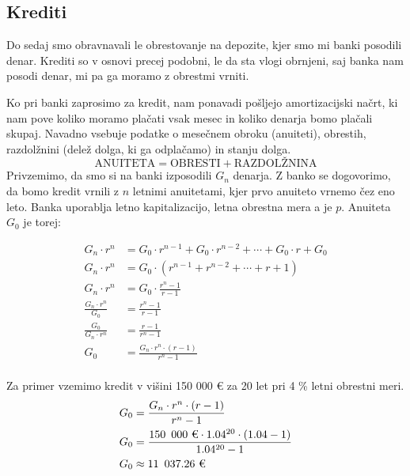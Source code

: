 \documentclass[12pt]{article}
\begin{document}
    \subsection{Krediti}
    Do sedaj smo obravnavali le obrestovanje na depozite, kjer smo mi banki posodili denar.
    Krediti so v osnovi precej podobni, le da sta vlogi obrnjeni, saj banka nam posodi
    denar, mi pa ga moramo z obrestmi vrniti.

    Ko pri banki zaprosimo za kredit, nam ponavadi pošljejo amortizacijski načrt, ki nam
    pove koliko moramo plačati vsak mesec in koliko denarja bomo plačali skupaj. Navadno
    vsebuje podatke o mesečnem obroku (anuiteti), obrestih, razdolžnini (delež dolga, ki 
    ga odplačamo) in stanju dolga. 
    $$\text{ANUITETA} = \text{OBRESTI} + \text{RAZDOLŽNINA}$$
    Privzemimo, da smo si na banki izposodili $G_n$ denarja. Z banko se dogovorimo, da bomo
    kredit vrnili z $n$ letnimi anuitetami, kjer prvo anuiteto vrnemo čez eno leto. Banka
    uporablja letno kapitalizacijo, letna obrestna mera a je $p$. Anuiteta $G_0$ je torej:
    
    \begin{equation}
        \begin{split}
            G_n \cdot r^n & = G_0 \cdot r^{n - 1} + G_0 \cdot r^{n - 2} + \cdots + G_0 \cdot r + G_0 \\
            G_n \cdot r^n & = G_0 \cdot (r^{n - 1} + r^{n - 2} + \cdots + r + 1) \\
            G_n \cdot r^n & = G_0 \cdot \frac{r^n - 1}{r - 1} \\
            \frac{G_n \cdot r^n}{G_0} & = \frac{r^n - 1}{r - 1} \\
            \frac{G_0}{G_n \cdot r^n} & = \frac{r - 1}{r^n - 1} \\
            G_0 & = \frac{G_n \cdot r^n \cdot (r - 1)}{r^n - 1} \\
        \end{split}
    \end{equation}

    Za primer vzemimo kredit v višini 150 000 € za 20 let pri 4 \% letni obrestni meri. 
    \begin{equation}
        \begin{split}
            G_0 & = \frac{G_n \cdot r^n \cdot (r - 1)}{r^n - 1} \\
            G_0 & = \frac{150 \enskip 000 \text{ €} \cdot 1.04^{20} \cdot (1.04 - 1)}{1.04^{20} - 1} \\
            G_0 & \approx 11 \enskip 037.26 \text{ €}
        \end{split}
    \end{equation}
\end{document}
